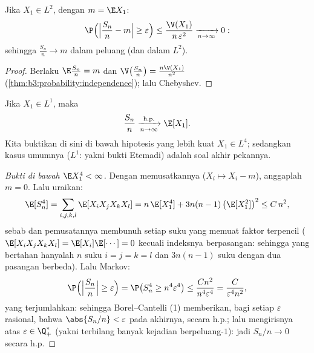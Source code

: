 \begin{theorem}
\label{thm:b3:probability:wlln}
Jika $X_1 \in L^2$, dengan $m = \E X_1$:
\[
\P\Bigl(\Bigl|\frac{S_n}{n} - m\Bigr| \geq
\varepsilon\Bigr) \leq
\frac{\V(X_1)}{n\,\varepsilon^2}
\xrightarrow[n\to\infty]{} 0 :
\]
sehingga $\frac{S_n}n \to m$ dalam peluang (dan dalam $L^2$).
\end{theorem}

\begin{proof}
Berlaku $\E\frac{S_n}n = m$ dan $\V\bigl(\frac{S_n}n\bigr) =
\frac{n\V(X_1)}{n^2}$
(\cref{thm:b3:probability:independence}); lalu Chebyshev.
\end{proof}

\begin{theorem}
\label{thm:b3:probability:slln}
Jika $X_1 \in L^1$, maka
\[
\frac{S_n}{n} \xrightarrow[n\to\infty]{\text{h.p.}} \E[X_1].
\]
Kita buktikan di sini di bawah hipotesis yang lebih kuat $X_1 \in
L^4$; sedangkan kasus umumnya ($L^1$: yakni bukti Etemadi) adalah
soal akhir pekannya.
\end{theorem}

\begin{proof}[Bukti di bawah $\E X_1^4 < \infty$]
Dengan memusatkannya ($X_i \mapsto X_i - m$), anggaplah $m = 0$. Lalu uraikan:
\[
\E[S_n^4] = \sum_{i,j,k,l}\E[X_iX_jX_kX_l]
= n\,\E[X_1^4] + 3n(n-1)\,\bigl(\E[X_1^2]\bigr)^2 \leq
C\,n^2 ,
\]
sebab  dan pemusatannya membunuh setiap suku yang memuat
faktor terpencil ($\E[X_iX_jX_kX_l] =
\E[X_i]\E[\cdots] = 0$ kecuali indeksnya berpasangan: sehingga yang
bertahan hanyalah $n$ suku $i=j=k=l$ dan $3n(n-1)$
suku dengan dua pasangan berbeda). Lalu Markov:
\[
\P\Bigl(\Bigl|\frac{S_n}n\Bigr| \geq \varepsilon\Bigr)
= \P\bigl(S_n^4 \geq n^4\varepsilon^4\bigr)
\leq \frac{Cn^2}{n^4\varepsilon^4} =
\frac{C}{\varepsilon^4n^2},
\]
yang terjumlahkan: sehingga Borel--Cantelli (1) memberikan, bagi setiap
$\varepsilon$ rasional, bahwa $\abs{S_n/n} < \varepsilon$ pada akhirnya,
secara h.p.; lalu mengirisnya atas $\varepsilon \in \Q_+^*$ (yakni terbilang banyak
kejadian berpeluang-$1$): jadi $S_n/n \to 0$ secara h.p.
\end{proof}

